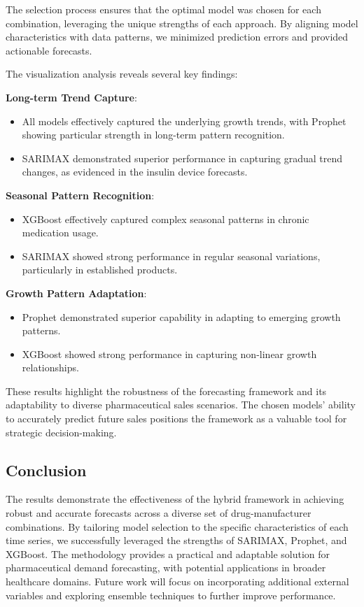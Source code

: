 \documentclass[journal]{IEEEtran}
\begin{document}
The selection process ensures that the optimal model was chosen for each combination, leveraging the unique strengths of each approach. By aligning model characteristics with data patterns, we minimized prediction errors and provided actionable forecasts.

The visualization analysis reveals several key findings:

\textbf{Long-term Trend Capture}:
\begin{itemize}
\item All models effectively captured the underlying growth trends, with Prophet showing particular strength in long-term pattern recognition.
\item SARIMAX demonstrated superior performance in capturing gradual trend changes, as evidenced in the insulin device forecasts.
\end{itemize}
\textbf{Seasonal Pattern Recognition}:
\begin{itemize}
\item XGBoost effectively captured complex seasonal patterns in chronic medication usage.
\item SARIMAX showed strong performance in regular seasonal variations, particularly in established products.
\end{itemize}
\textbf{Growth Pattern Adaptation}:
\begin{itemize}
\item Prophet demonstrated superior capability in adapting to emerging growth patterns.
\item XGBoost showed strong performance in capturing non-linear growth relationships.
\end{itemize}

These results highlight the robustness of the forecasting framework and its adaptability to diverse pharmaceutical sales scenarios. The chosen models’ ability to accurately predict future sales positions the framework as a valuable tool for strategic decision-making.


\subsection{Conclusion}
The results demonstrate the effectiveness of the hybrid framework in achieving robust and accurate forecasts across a diverse set of drug-manufacturer combinations. By tailoring model selection to the specific characteristics of each time series, we successfully leveraged the strengths of SARIMAX, Prophet, and XGBoost. The methodology provides a practical and adaptable solution for pharmaceutical demand forecasting, with potential applications in broader healthcare domains. Future work will focus on incorporating additional external variables and exploring ensemble techniques to further improve performance.
\end{document}
